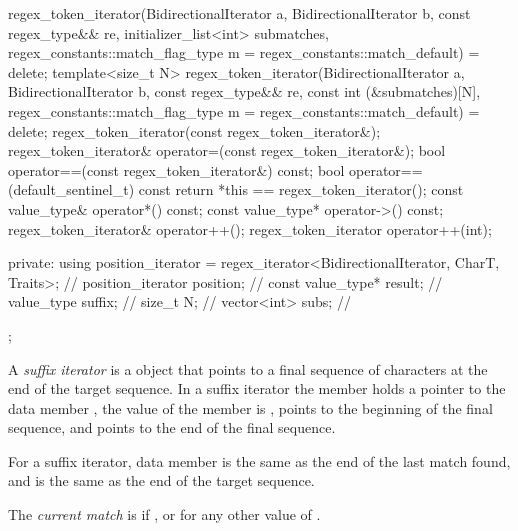 \begin{codeblock}
{{      regex_token_iterator(BidirectionalIterator a, BidirectionalIterator b,
                           const regex_type&& re,
                           initializer_list<int> submatches,
                           regex_constants::match_flag_type m =
                             regex_constants::match_default) = delete;
      template<size_t N>
      regex_token_iterator(BidirectionalIterator a, BidirectionalIterator b,
                           const regex_type&& re,
                           const int (&submatches)[N],
                           regex_constants::match_flag_type m =
                             regex_constants::match_default) = delete;
      regex_token_iterator(const regex_token_iterator&);
      regex_token_iterator& operator=(const regex_token_iterator&);
      bool operator==(const regex_token_iterator&) const;
      bool operator==(default_sentinel_t) const { return *this == regex_token_iterator(); }
      const value_type& operator*() const;
      const value_type* operator->() const;
      regex_token_iterator& operator++();
      regex_token_iterator operator++(int);

    private:
      using position_iterator =
        regex_iterator<BidirectionalIterator, CharT, Traits>;   // \expos
      position_iterator position;                               // \expos
      const value_type* result;                                 // \expos
      value_type suffix;                                        // \expos
      size_t N;                                                 // \expos
      vector<int> subs;                                         // \expos
    };
}
\end{codeblock}

\pnum
A \textit{suffix iterator} is a  object
that points to a final sequence of characters at
the end of the target sequence. In a suffix iterator the
member  holds a pointer to the data
member , the value of the member 
is ,  points to the beginning of the
final sequence, and  points to the end of the
final sequence.

\pnum
\begin{note}
For a suffix iterator, data
member  is the same as the end of the last match
found, and  is the same as the end of the target
sequence.
\end{note}

\pnum
The \textit{current match} is  if , or
 for any other value of .

